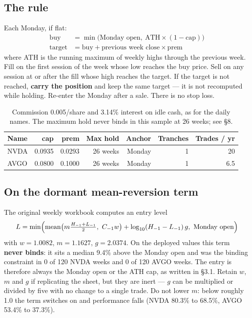 \documentclass[11pt]{article}
\begin{document}
\subsection{The rule}

Each Monday, if flat:
\begin{align*}
\text{buy} &= \min\bigl(\text{Monday open},\ \text{ATH}\times(1-\text{cap})\bigr)\\
\text{target} &= \text{buy} + \text{previous week close}\times\text{prem}
\end{align*}
where ATH is the running maximum of weekly highs through the previous week. Fill on the first
session of the week whose low reaches the buy price. Sell on any session at or after the fill
whose high reaches the target. If the target is not reached, \textbf{carry the position} and keep
the same target --- it is not recomputed while holding. Re-enter the Monday after a sale.
There is no stop loss.

\begin{table}[H]\centering\small
\begin{tabular}{lrrrrrr}
\toprule
\textbf{Name} & \textbf{cap} & \textbf{prem} & \textbf{Max hold} & \textbf{Anchor} &
\textbf{Tranches} & \textbf{Trades / yr}\\
\midrule
\rowcolor{bckeep} NVDA & 0.0935 & 0.0293 & 26 weeks & Monday & 1 & 20\\
AVGO & 0.0800 & 0.1000 & 26 weeks & Monday & 1 & 6.5\\
\bottomrule
\end{tabular}
\caption{Commission 0.005/share and 3.14\% interest on idle cash, as for the daily names. The
maximum hold never binds in this sample at 26 weeks; see \S8.}
\end{table}

\subsection{On the dormant mean-reversion term}

The original weekly workbook computes an entry level
\[
L=\min\Bigl(\operatorname{mean}\bigl(m\tfrac{H_{-1}+L_{-1}}{2},\ C_{-1}w\bigr)
+\log_{10}(H_{-1}-L_{-1})\,g,\ \text{Monday open}\Bigr)
\]
with $w=1.0082$, $m=1.1627$, $g=2.0374$. On the deployed values this term \textbf{never binds}:
it sits a median 9.4\% above the Monday open and was the binding constraint in 0 of 120 NVDA
weeks and 0 of 120 AVGO weeks. The entry is therefore always the Monday open or the ATH cap, as
written in \S3.1. Retain $w$, $m$ and $g$ if replicating the sheet, but they are inert ---
$g$ can be multiplied or divided by five with no change to a single trade. Do not lower $m$:
below roughly 1.0 the term switches on and performance falls (NVDA 80.3\% to 68.5\%, AVGO 53.4\%
to 37.3\%).
\end{document}
